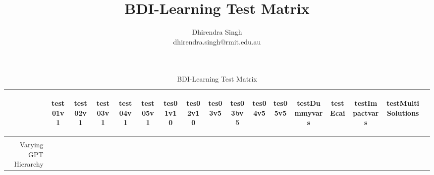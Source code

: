 \documentclass[landscape,a4paper,title page]{article}
\title{BDI-Learning Test Matrix}
\author{
Dhirendra Singh\\ 
dhirendra.singh@rmit.edu.au\\
}
\newcommand{\x}{{\checked}}
\begin{document}
\maketitle

\begin{table}[!htb]
  \caption{BDI-Learning Test Matrix}
  \begin{tabular}{ r | c  c  c  c  c  c  c  c  c  c  c  c  c  c  c  c }
  \begin{turn}{60}\end{turn} &
  \begin{turn}{60} test01v1 \end{turn} &
  \begin{turn}{60} test02v1 \end{turn} &
  \begin{turn}{60} test03v1 \end{turn} &
  \begin{turn}{60} test04v1 \end{turn} &
  \begin{turn}{60} test05v1 \end{turn} &
  \begin{turn}{60} tes01v10 \end{turn} &
  \begin{turn}{60} tes02v10 \end{turn} &
  \begin{turn}{60} tes03v5 \end{turn} &
  \begin{turn}{60} tes03bv5 \end{turn} &
  \begin{turn}{60} tes04v5 \end{turn} &
  \begin{turn}{60} tes05v5 \end{turn} &
  \begin{turn}{60} testDummyvars \end{turn} &
  \begin{turn}{60} testEcai \end{turn} &
  \begin{turn}{60} testImpactvars \end{turn} &
  \begin{turn}{60} testMultiSolutions \end{turn}
  \\ \hline \\
  Varying GPT Hierarchy & \x & \x & \x & \x & \x & \x & \x & \x & \x & \x & \x & \x & \x & \x & \x \\

\end{tabular}
\end{table}
\end{document}

